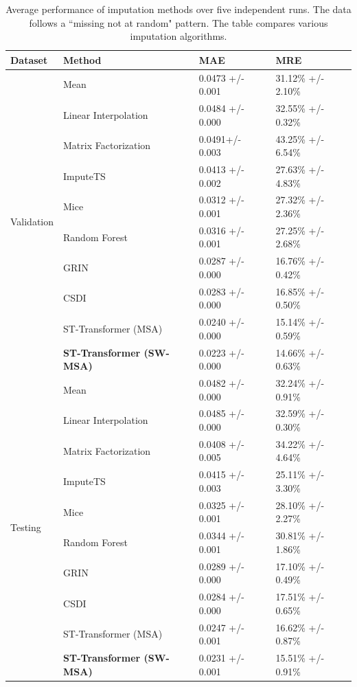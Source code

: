 \documentclass[review]{elsarticle}
\begin{document}
\begin{table}[h!]
    \centering
    \begin{tabularx}{\textwidth}{lXXX}
        \toprule
        Dataset & Method & MAE & MRE \\
        \midrule
        \multirow{10}{*}{Validation}&
        Mean & 0.0473 +/- 0.001& 31.12\% +/- 2.10\%  \\
        &Linear Interpolation & 0.0484 +/- 0.000 & 32.55\% +/- 0.32\%\\
        &Matrix Factorization & 0.0491+/- 0.003 & 43.25\% +/- 6.54\% \\
        &ImputeTS & 0.0413 +/- 0.002 & 27.63\% +/- 4.83\% \\
        &Mice & 0.0312 +/- 0.001& 27.32\% +/- 2.36\% \\
        &Random Forest &  0.0316 +/- 0.001&  27.25\% +/- 2.68\%\\
        &GRIN & 0.0287 +/- 0.000 & 16.76\% +/- 0.42\%\\
        &CSDI & 0.0283 +/- 0.000 &16.85\% +/- 0.50\%\\
        &ST-Transformer (MSA) & 0.0240 +/- 0.000 & 15.14\% +/- 0.59\%\\
        &\textbf{ST-Transformer (SW-MSA)} & 0.0223 +/- 0.000 & 14.66\% +/- 0.63\%\\
        
        \midrule
        \multirow{10}{*}{Testing}&Mean & 0.0482 +/- 0.000 & 32.24\% +/- 0.91\%  \\
        &Linear Interpolation & 0.0485 +/- 0.000& 32.59\% +/- 0.30\%\\
        &Matrix Factorization & 0.0408 +/- 0.005& 34.22\% +/- 4.64\% \\
        &ImputeTS & 0.0415 +/- 0.003 & 25.11\% +/- 3.30\% \\
        &Mice & 0.0325 +/- 0.001& 28.10\% +/- 2.27\% \\
        &Random Forest &  0.0344 +/- 0.001&  30.81\% +/- 1.86\%\\
        &GRIN & 0.0289 +/- 0.000 & 17.10\% +/- 0.49\%\\
        &CSDI & 0.0284 +/- 0.000 &17.51\% +/- 0.65\%\\
        &ST-Transformer (MSA) & 0.0247 +/- 0.001 & 16.62\% +/- 0.87\%\\

        &\textbf{ST-Transformer (SW-MSA)} & 0.0231 +/- 0.001 & 15.51\% +/- 0.91\%\\
        \bottomrule
        

    \end{tabularx}
    \caption{Average performance of imputation methods over five independent runs. The data follows a ``missing not at random" pattern. The table compares various imputation algorithms.}
    \label{tab: missing at time points}
\end{table}
\end{document}
